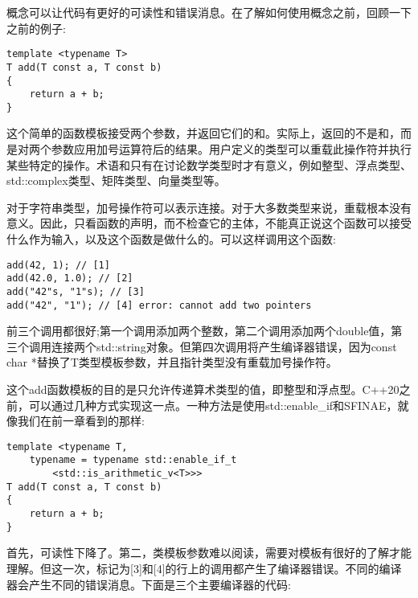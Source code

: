 概念可以让代码有更好的可读性和错误消息。在了解如何使用概念之前，回顾一下之前的例子:

\begin{lstlisting}[style=styleCXX]
template <typename T>
T add(T const a, T const b)
{
	return a + b;
}
\end{lstlisting}

这个简单的函数模板接受两个参数，并返回它们的和。实际上，返回的不是和，而是对两个参数应用加号运算符后的结果。用户定义的类型可以重载此操作符并执行某些特定的操作。术语和只有在讨论数学类型时才有意义，例如整型、浮点类型、std::complex类型、矩阵类型、向量类型等。

对于字符串类型，加号操作符可以表示连接。对于大多数类型来说，重载根本没有意义。因此，只看函数的声明，而不检查它的主体，不能真正说这个函数可以接受什么作为输入，以及这个函数是做什么的。可以这样调用这个函数:

\begin{lstlisting}[style=styleCXX]
add(42, 1); // [1]
add(42.0, 1.0); // [2]
add("42"s, "1"s); // [3]
add("42", "1"); // [4] error: cannot add two pointers
\end{lstlisting}

前三个调用都很好;第一个调用添加两个整数，第二个调用添加两个double值，第三个调用连接两个std::string对象。但第四次调用将产生编译器错误，因为const char *替换了T类型模板参数，并且指针类型没有重载加号操作符。

这个add函数模板的目的是只允许传递算术类型的值，即整型和浮点型。C++20之前，可以通过几种方式实现这一点。一种方法是使用std::enable\_if和SFINAE，就像我们在前一章看到的那样:

\begin{lstlisting}[style=styleCXX]
template <typename T,
	typename = typename std::enable_if_t
		<std::is_arithmetic_v<T>>>
T add(T const a, T const b)
{
	return a + b;
}
\end{lstlisting}

首先，可读性下降了。第二，类模板参数难以阅读，需要对模板有很好的了解才能理解。但这一次，标记为[3]和[4]的行上的调用都产生了编译器错误。不同的编译器会产生不同的错误消息。下面是三个主要编译器的代码:


